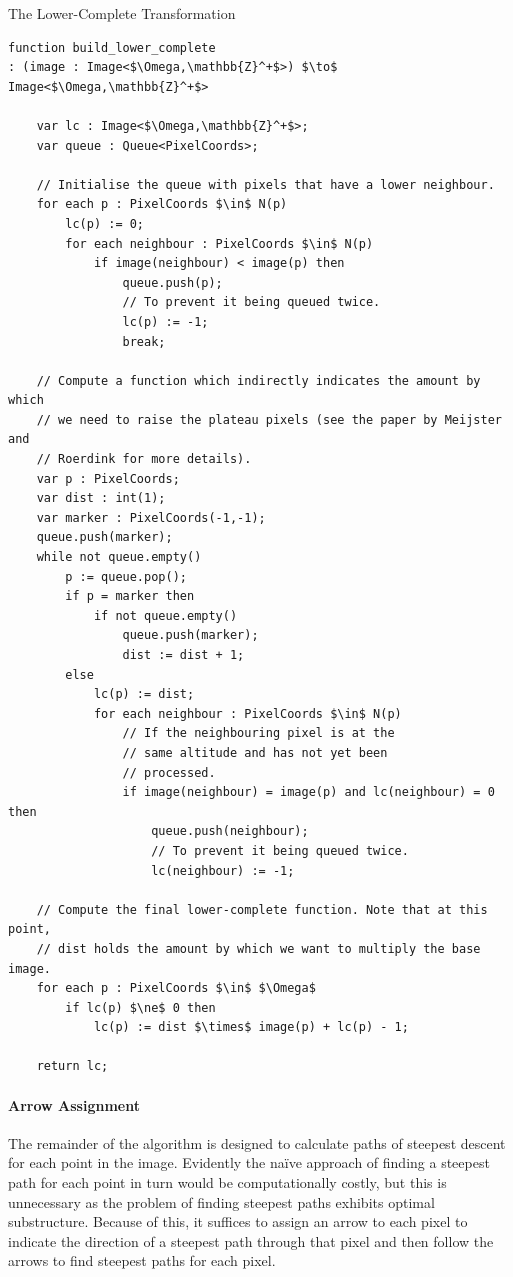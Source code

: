 \begin{stulisting}[t]
\caption{The Lower-Complete Transformation}
\label{code:segmentation-watershed-lowercomplete}
\begin{lstlisting}[style=Default]
function build_lower_complete
: (image : Image<$\Omega,\mathbb{Z}^+$>) $\to$ Image<$\Omega,\mathbb{Z}^+$>

	var lc : Image<$\Omega,\mathbb{Z}^+$>;
	var queue : Queue<PixelCoords>;

	// Initialise the queue with pixels that have a lower neighbour.
	for each p : PixelCoords $\in$ N(p)
		lc(p) := 0;
		for each neighbour : PixelCoords $\in$ N(p)
			if image(neighbour) < image(p) then
				queue.push(p);
				// To prevent it being queued twice.
				lc(p) := -1;
				break;

	// Compute a function which indirectly indicates the amount by which
	// we need to raise the plateau pixels (see the paper by Meijster and
	// Roerdink for more details).
	var p : PixelCoords;
	var dist : int(1);
	var marker : PixelCoords(-1,-1);
	queue.push(marker);
	while not queue.empty()
		p := queue.pop();
		if p = marker then
			if not queue.empty()
				queue.push(marker);
				dist := dist + 1;
		else
			lc(p) := dist;
			for each neighbour : PixelCoords $\in$ N(p)
				// If the neighbouring pixel is at the
				// same altitude and has not yet been
				// processed.
				if image(neighbour) = image(p) and lc(neighbour) = 0 then
					queue.push(neighbour);
					// To prevent it being queued twice.
					lc(neighbour) := -1;
	
	// Compute the final lower-complete function. Note that at this point,
	// dist holds the amount by which we want to multiply the base image.
	for each p : PixelCoords $\in$ $\Omega$
		if lc(p) $\ne$ 0 then
			lc(p) := dist $\times$ image(p) + lc(p) - 1;

	return lc;
\end{lstlisting}
\end{stulisting}

\paragraph{Arrow Assignment}

The remainder of the algorithm is designed to calculate paths of steepest descent for each point in the image. Evidently the na\"ive approach of finding a steepest path for each point in turn would be computationally costly, but this is unnecessary as the problem of finding steepest paths exhibits optimal substructure. Because of this, it suffices to assign an arrow to each pixel to indicate the direction of a steepest path through that pixel and then follow the arrows to find steepest paths for each pixel.

